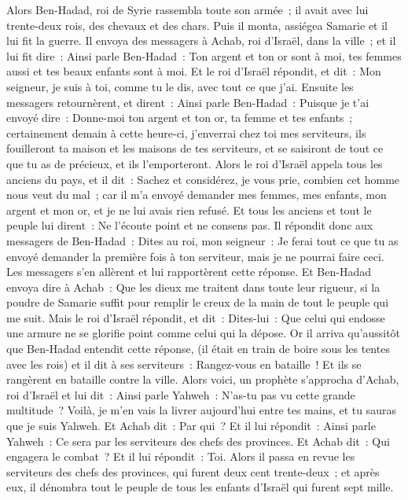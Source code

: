 \begin{multicols}{2}
\VerseOne{}Alors Ben-Hadad, roi de Syrie rassembla toute son armée~; il avait avec lui trente-deux rois, des chevaux et des chars. Puis il monta, assiégea Samarie et il lui fit la guerre.
Il envoya des messagers à Achab, roi d'Israël, dans la ville~;
et il lui fit dire~: Ainsi parle Ben-Hadad~: Ton argent et ton or sont à moi, tes femmes aussi et tes beaux enfants sont à moi.
Et le roi d'Israël répondit, et dit~: Mon seigneur, je suis à toi, comme tu le dis, avec tout ce que j'ai.
Ensuite les messagers retournèrent, et dirent~: Ainsi parle Ben-Hadad~: Puisque je t'ai envoyé dire~: Donne-moi ton argent et ton or, ta femme et tes enfants~;
certainement demain à cette heure-ci, j'enverrai chez toi mes serviteurs, ils fouilleront ta maison et les maisons de tes serviteurs, et se saisiront de tout ce que tu as de précieux, et ils l'emporteront.
Alors le roi d'Israël appela tous les anciens du pays, et il dit~: Sachez et considérez, je vous prie, combien cet homme nous veut du mal~; car il m'a envoyé demander mes femmes, mes enfants, mon argent et mon or, et je ne lui avais rien refusé.
Et tous les anciens et tout le peuple lui dirent~: Ne l'écoute point et ne consens pas.
Il répondit donc aux messagers de Ben-Hadad~: Dites au roi, mon seigneur~: Je ferai tout ce que tu as envoyé demander la première fois à ton serviteur, mais je ne pourrai faire ceci. Les messagers s'en allèrent et lui rapportèrent cette réponse.
Et Ben-Hadad envoya dire à Achab~: Que les dieux me traitent dans toute leur rigueur, si la poudre de Samarie suffit pour remplir le creux de la main de tout le peuple qui me suit.
Mais le roi d'Israël répondit, et dit~: Dites-lui~: Que celui qui endosse une armure ne se glorifie point comme celui qui la dépose.
Or il arriva qu'aussitôt que Ben-Hadad entendit cette réponse, (il était en train de boire sous les tentes avec les rois) et il dit à ses serviteurs~: Rangez-vous en bataille~! Et ils se rangèrent en bataille contre la ville.
Alors voici, un prophète s'approcha d'Achab, roi d'Israël et lui dit~: Ainsi parle Yahweh~: N'as-tu pas vu cette grande multitude~? Voilà, je m'en vais la livrer aujourd'hui entre tes mains, et tu sauras que je suis Yahweh.
Et Achab dit~: Par qui~? Et il lui répondit~: Ainsi parle Yahweh~: Ce sera par les serviteurs des chefs des provinces. Et Achab dit~: Qui engagera le combat~? Et il lui répondit~: Toi.
Alors il passa en revue les serviteurs des chefs des provinces, qui furent deux cent trente-deux~; et après eux, il dénombra tout le peuple de tous les enfants d'Israël qui furent sept mille.

\end{multicols}
